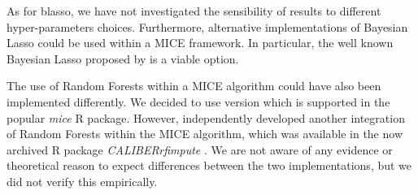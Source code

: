 	As for blasso, we have not investigated the sensibility of results to different hyper-parameters choices.
	Furthermore, alternative implementations of Bayesian Lasso could be used within a MICE framework.
	In particular, the well known Bayesian Lasso proposed by \cite{parkCasella:2008} is a viable option.

	The use of Random Forests within a MICE algorithm could have also been implemented differently.
	We decided to use \cite{dooveEtAl:2014} version which is supported in the popular 
	\emph{mice} R package.
	However, \cite{shahEtAl:2014} independently developed another integration of Random Forests
	within the MICE algorithm, which was available in the now archived R package \emph{CALIBERrfimpute}
	\citep{CALIBERrfimpute}.
	We are not aware of any evidence or theoretical reason to expect differences between the two implementations, 
	but we did not verify this empirically.

